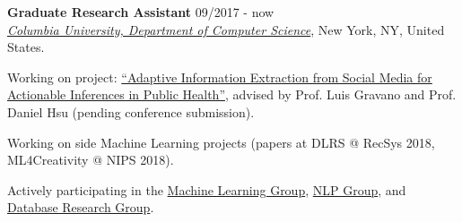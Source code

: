 \documentclass[letterpaper]{article}
\renewenvironment{itemize}{
  \begin{list}{}{
    \setlength{\leftmargin}{1.5em}
  }
}{
  \end{list}
}
\begin{document}
\begin{itemize}

\item 
    \textbf{Graduate Research Assistant} \hfill 09/2017 - now\\ 
    \href{https://www.cs.columbia.edu/}{\it Columbia University, Department of Computer Science}, New York, NY, United States.
    \begin{itemize}
        \item[-] Working on project: \href{http://publichealth.cs.columbia.edu/}{``Adaptive Information Extraction from Social Media for Actionable Inferences in Public Health''}, advised by Prof. Luis Gravano and Prof. Daniel Hsu (pending conference submission).
        \item[-] Working on side Machine Learning projects (papers at DLRS @ RecSys 2018, ML4Creativity @ NIPS 2018).
        \item[-] Actively participating in the \href{http://www.cs.columbia.edu/areas/machine/}{Machine Learning Group}, \href{http://www.cs.columbia.edu/nlp/index.cgi}{NLP Group}, and \href{https://cudbg.github.io/}{Database Research Group}.
    \end{itemize}  
    

\end{itemize}
\end{document}
